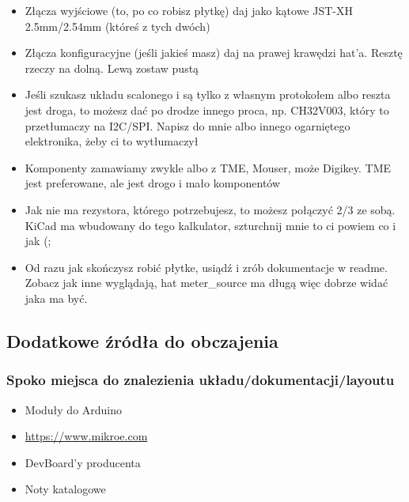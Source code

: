 \documentclass[b5paper, 10pt, twoside]{book}
\begin{document}
\begin{itemize}
  \item Złącza wyjściowe (to, po co robisz płytkę) daj jako kątowe JST-XH 2.5mm/2.54mm (któreś z tych dwóch)
  \item Złącza konfiguracyjne (jeśli jakieś masz) daj na prawej krawędzi hat'a. Resztę rzeczy na dolną. Lewą zostaw pustą
  \item Jeśli szukasz układu scalonego i są tylko z własnym protokołem albo reszta jest droga, to możesz dać po drodze innego proca, np. CH32V003, który to przetłumaczy na I2C/SPI. Napisz do mnie albo innego ogarniętego elektronika, żeby ci to wytłumaczył
  \item Komponenty zamawiamy zwykle albo z TME, Mouser, może Digikey. TME jest preferowane, ale jest drogo i mało komponentów
  \item Jak nie ma rezystora, którego potrzebujesz, to możesz połączyć 2/3 ze sobą. KiCad ma wbudowany do tego kalkulator, szturchnij mnie to ci powiem co i jak (;
  \item Od razu jak skończysz robić płytke, usiądź i zrób dokumentacje w readme. Zobacz jak inne wyglądają, hat meter\_source ma długą więc dobrze widać jaka ma być.

\end{itemize}

\subsection{Dodatkowe źródła do obczajenia}

\subsubsection{Spoko miejsca do znalezienia układu/dokumentacji/layoutu}
\begin{itemize}
  \item Moduły do Arduino
  \item \url{https://www.mikroe.com}
  \item DevBoard'y producenta
  \item Noty katalogowe
\end{itemize}
\end{document}
